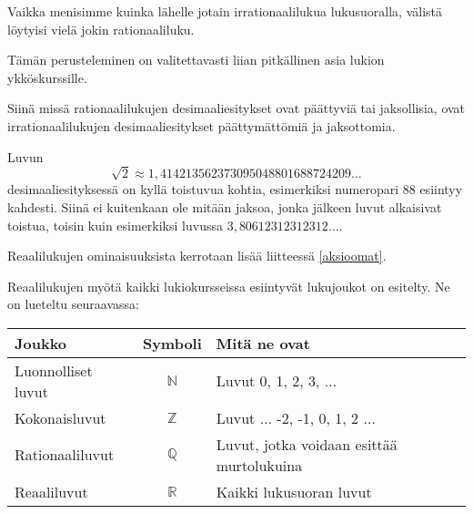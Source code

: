 Vaikka menisimme kuinka lähelle jotain irrationaalilukua lukusuoralla, välistä löytyisi vielä jokin rationaaliluku.



Tämän perusteleminen on valitettavasti liian pitkällinen asia lukion ykköskurssille.


Siinä missä rationaalilukujen desimaaliesitykset ovat päättyviä tai jaksollisia, ovat irrationaalilukujen desimaaliesitykset päättymättömiä ja
jaksottomia.

Luvun
\[\sqrt{2} \approx 1,414213562373095048801688724209\ldots\]
desimaaliesityksessä on kyllä toistuvua kohtia, esimerkiksi numeropari $88$ esiintyy kahdesti. Siinä ei kuitenkaan ole mitään jaksoa, jonka jälkeen luvut alkaisivat toistua, toisin kuin esimerkiksi luvussa $3,80612312312312\ldots$.

Reaalilukujen ominaisuuksista kerrotaan lisää liitteessä \ref{aksioomat}.


Reaalilukujen myötä kaikki lukiokursseissa esiintyvät lukujoukot on esitelty. Ne on lueteltu seuraavassa:
\begin{center}\begin{tabular}{l|c|l}
Joukko & Symboli & Mitä ne ovat\\
\hline
Luonnolliset luvut & $\mathbb{N}$ &
Luvut 0, 1, 2, 3, $\ldots$ \\
Kokonaisluvut & $\mathbb{Z}$ & Luvut $\ldots$ -2, -1, 0, 1, 2 $\ldots$ \\
Rationaaliluvut & $\mathbb{Q}$ & Luvut, jotka voidaan esittää
murtolukuina \\
Reaaliluvut & $\mathbb{R}$ & Kaikki lukusuoran luvut
\end{tabular} \end{center} 


